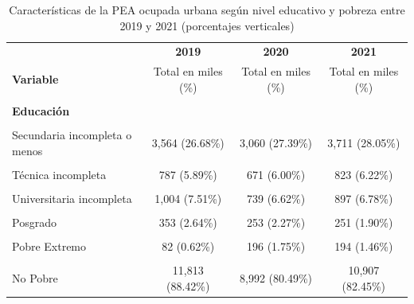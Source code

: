 \documentclass[
  letterpaper,
  12pt,
  oneside,
  spanish,
  doublespacing,
  headsepline,
  parskip]{MastersDoctoralThesis}
\begin{document}
\hypertarget{tbl-edpobre}{}
\begin{table}[H]
\caption{\label{tbl-edpobre}Características de la PEA ocupada urbana según nivel educativo y pobreza
entre 2019 y 2021 (porcentajes verticales) }\tabularnewline

\centering\begingroup\fontsize{10}{12}\selectfont

\begin{tabular}{lccc}
\toprule
\multicolumn{1}{c}{ } & \multicolumn{1}{c}{\textbf{2019}} & \multicolumn{1}{c}{\textbf{2020}} & \multicolumn{1}{c}{\textbf{2021}} \\
\cmidrule(l{3pt}r{3pt}){2-2} \cmidrule(l{3pt}r{3pt}){3-3} \cmidrule(l{3pt}r{3pt}){4-4}
\textbf{Variable} & Total en miles (\%) & Total en miles (\%) & Total en miles (\%)\\
\midrule
\cellcolor{gray!6}{\textbf{Nacional}} & \cellcolor{gray!6}{13,360 (100.00\%)} & \cellcolor{gray!6}{11,172 (100.00\%)} & \cellcolor{gray!6}{13,229 (100.00\%)}\\
\textbf{Educación} &  &  & \\
\cellcolor{gray!6}{Sin nivel} & \cellcolor{gray!6}{225 (1.68\%)} & \cellcolor{gray!6}{171 (1.54\%)} & \cellcolor{gray!6}{205 (1.55\%)}\\
Secundaria incompleta o menos & 3,564 (26.68\%) & 3,060 (27.39\%) & 3,711 (28.05\%)\\
\cellcolor{gray!6}{Secundaria completa} & \cellcolor{gray!6}{4,177 (31.27\%)} & \cellcolor{gray!6}{3,622 (32.43\%)} & \cellcolor{gray!6}{4,434 (33.51\%)}\\
\addlinespace
Técnica incompleta & 787 (5.89\%) & 671 (6.00\%) & 823 (6.22\%)\\
\cellcolor{gray!6}{Técnica completa} & \cellcolor{gray!6}{1,687 (12.63\%)} & \cellcolor{gray!6}{1,376 (12.32\%)} & \cellcolor{gray!6}{1,542 (11.66\%)}\\
Universitaria incompleta & 1,004 (7.51\%) & 739 (6.62\%) & 897 (6.78\%)\\
\cellcolor{gray!6}{Universitaria completa} & \cellcolor{gray!6}{1,563 (11.70\%)} & \cellcolor{gray!6}{1,279 (11.45\%)} & \cellcolor{gray!6}{1,366 (10.32\%)}\\
Posgrado & 353 (2.64\%) & 253 (2.27\%) & 251 (1.90\%)\\
\addlinespace
\cellcolor{gray!6}{\textbf{Pobreza}} & \cellcolor{gray!6}{} & \cellcolor{gray!6}{} & \cellcolor{gray!6}{}\\
Pobre Extremo & 82 (0.62\%) & 196 (1.75\%) & 194 (1.46\%)\\
\cellcolor{gray!6}{Pobre No Extremo} & \cellcolor{gray!6}{1,465 (10.97\%)} & \cellcolor{gray!6}{1,984 (17.76\%)} & \cellcolor{gray!6}{2,128 (16.09\%)}\\
No Pobre & 11,813 (88.42\%) & 8,992 (80.49\%) & 10,907 (82.45\%)\\
\bottomrule
\end{tabular}
\endgroup{}
\end{table}
\end{document}
